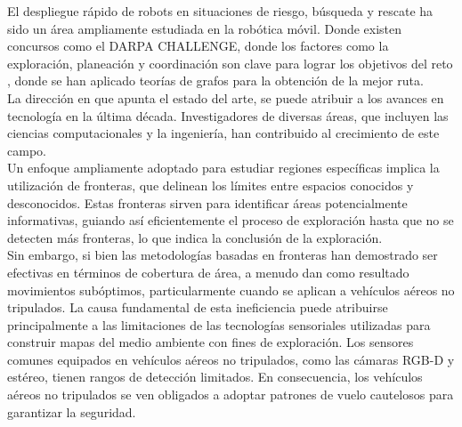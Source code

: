 \documentclass[sigconf]{acmart}
\begin{document}
El despliegue rápido de robots en situaciones de riesgo, búsqueda y rescate ha sido un área ampliamente estudiada en la robótica móvil. Donde existen concursos como el DARPA CHALLENGE, donde los factores como la exploración, planeación y coordinación son clave para lograr los objetivos del reto \cite{DARPA2022}, donde se han aplicado teorías de grafos para la obtención de la mejor ruta.\\


La dirección en que apunta el estado del arte, se puede atribuir a los avances en tecnología en la última década. Investigadores de diversas áreas, que incluyen las ciencias computacionales y la ingeniería, han contribuido al crecimiento de este campo.\\

Un enfoque ampliamente adoptado para estudiar regiones específicas implica la utilización de fronteras, que delinean los límites entre espacios conocidos y desconocidos. Estas fronteras sirven para identificar áreas potencialmente informativas, guiando así eficientemente el proceso de exploración hasta que no se detecten más fronteras, lo que indica la conclusión de la exploración.\\

Sin embargo, si bien las metodologías basadas en fronteras han demostrado ser efectivas en términos de cobertura de área, a menudo dan como resultado movimientos subóptimos, particularmente cuando se aplican a vehículos aéreos no tripulados. La causa fundamental de esta ineficiencia puede atribuirse principalmente a las limitaciones de las tecnologías sensoriales utilizadas para construir mapas del medio ambiente con fines de exploración. Los sensores comunes equipados en vehículos aéreos no tripulados, como las cámaras RGB-D y estéreo, tienen rangos de detección limitados. En consecuencia, los vehículos aéreos no tripulados se ven obligados a adoptar patrones de vuelo cautelosos para garantizar la seguridad.\\
\end{document}
